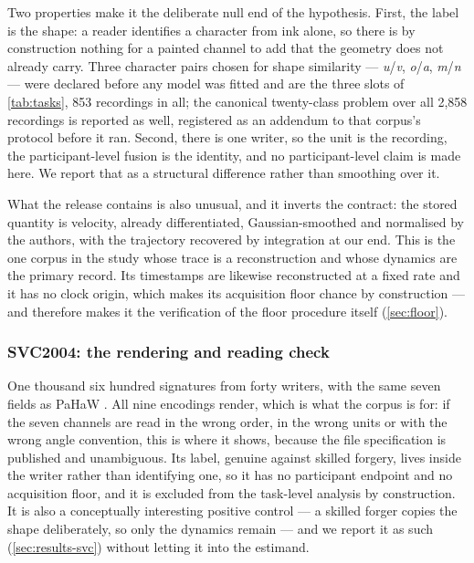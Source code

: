 Two properties make it the deliberate null end of the hypothesis. First, the label is the shape: a
reader identifies a character from ink alone, so there is by construction nothing for a painted
channel to add that the geometry does not already carry. Three character pairs chosen for shape
similarity --- \textit{u}/\textit{v}, \textit{o}/\textit{a}, \textit{m}/\textit{n} --- were declared
before any model was fitted and are the three slots of \cref{tab:tasks}, 853 recordings in all; the
canonical twenty-class problem over all 2,858 recordings is reported as well, registered as an
addendum to that corpus's protocol before it ran. Second, there is one writer, so the unit is the
recording, the participant-level fusion is the identity, and no participant-level claim is made
here. We report that as a structural difference rather than smoothing over it.

What the release contains is also unusual, and it inverts the contract: the stored quantity is
velocity, already differentiated, Gaussian-smoothed and normalised by the authors, with the
trajectory recovered by integration at our end. This is the one corpus in the study whose trace is
a reconstruction and whose dynamics are the primary record. Its timestamps are likewise
reconstructed at a fixed rate and it has no clock origin, which makes its acquisition floor chance
by construction --- and therefore makes it the verification of the floor procedure itself
(\cref{sec:floor}).

\subsubsection{SVC2004: the rendering and reading check}
\label{sec:svc}

One thousand six hundred signatures from forty writers, with the same seven fields as PaHaW
\citep{yeung2004svc}. All nine encodings render, which is what the corpus is for: if the seven
channels are read in the wrong order, in the wrong units or with the wrong angle convention, this
is where it shows, because the file specification is published and unambiguous. Its label, genuine
against skilled forgery, lives inside the writer rather than identifying one, so it has no
participant endpoint and no acquisition floor, and it is excluded from the task-level analysis by
construction. It is also a conceptually interesting positive control --- a skilled forger copies
the shape deliberately, so only the dynamics remain --- and we report it as such
(\cref{sec:results-svc}) without letting it into the estimand.

